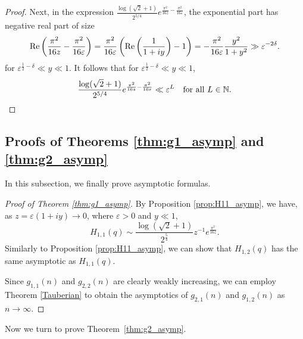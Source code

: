 \documentclass[11pt,reqno]{amsart}
\theoremstyle{remark}
\numberwithin{equation}{section}
\renewcommand{\Re}{{\rm Re}}
\renewcommand{\Re}{{\rm Re}}
\begin{document}
\begin{proof}
Next, in the expression  $\frac{\log(\sqrt{2}+1) }{2^{5/4}} e^{\frac{\pi^2}{16 z}-\frac{\pi^2}{16\varepsilon}}$, the exponential part has negative real part of size
\[
	\Re\left(\frac{\pi^2}{16 z}-\frac{\pi^2}{16\varepsilon}\right) = \frac{\pi^2}{16\varepsilon} \left( \Re\left(\frac{1}{1+iy}\right) -1\right) = - \frac{\pi^2}{16\varepsilon} \frac{y^2}{1+y^2} \gg \varepsilon^{-2\delta}.
\]
for $\varepsilon^{\frac12-\delta} \ll y \ll 1$. It follows that for $\varepsilon^{\frac12-\delta} \ll y \ll 1$,  %
\[
	\frac{\log(\sqrt{2}+1) }{2^{5/4}} e^{\frac{\pi^2}{16 z}-\frac{\pi^2}{16\varepsilon}} \ll \varepsilon^L \quad \text{for all $L \in \mathbb{N}$}. \qedhere
\]
\end{proof}

 
\subsection{Proofs of Theorems \ref{thm:g1_asymp} and \ref{thm:g2_asymp}}
In this subsection, we finally prove asymptotic formulas. 
\begin{proof}[Proof of Theorem \ref{thm:g1_asymp}]
By Proposition \ref{prop:H11_asymp}, we have, as $z=\varepsilon(1+iy) \to 0$, where $\varepsilon>0$ and $y \ll 1$,  
\[
	H_{1,1}(q) \sim \frac{\log(\sqrt{2}+1) }{2^{\frac54}}  z^{-1} e^{\frac{\pi^2}{16 z}}.
\]
Similarly to Proposition \ref{prop:H11_asymp}, we can show that $H_{1,2}(q)$ has the same asymptotic as $H_{1,1}(q)$.

Since $g_{1,1}(n)$ and $g_{2,2}(n)$ are clearly weakly increasing, we can employ Theorem  \ref{Tauberian} to obtain the asymptotics of $g_{2,1}(n)$ and $g_{1,2}(n)$ as $n \to \infty$. 
\end{proof}

Now we turn to prove Theorem~\ref{thm:g2_asymp}.
\end{document}
